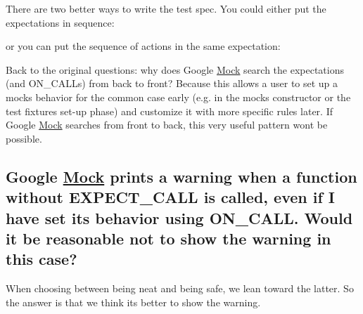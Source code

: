 There are two better ways to write the test spec. You could either put the expectations in sequence\+:


\begin{DoxyCode}{0}
\DoxyCodeLine{\{}
\DoxyCodeLine{\}}
\end{DoxyCode}


or you can put the sequence of actions in the same expectation\+:


\begin{DoxyCode}{0}
\end{DoxyCode}


Back to the original questions\+: why does Google \mbox{\hyperlink{classMock}{Mock}} search the expectations (and {\ttfamily O\+N\+\_\+\+C\+A\+LL}s) from back to front? Because this allows a user to set up a mock\textquotesingle{}s behavior for the common case early (e.\+g. in the mock\textquotesingle{}s constructor or the test fixture\textquotesingle{}s set-\/up phase) and customize it with more specific rules later. If Google \mbox{\hyperlink{classMock}{Mock}} searches from front to back, this very useful pattern won\textquotesingle{}t be possible.

\subsection*{Google \mbox{\hyperlink{classMock}{Mock}} prints a warning when a function without E\+X\+P\+E\+C\+T\+\_\+\+C\+A\+LL is called, even if I have set its behavior using O\+N\+\_\+\+C\+A\+LL. Would it be reasonable not to show the warning in this case?}

When choosing between being neat and being safe, we lean toward the latter. So the answer is that we think it\textquotesingle{}s better to show the warning.

